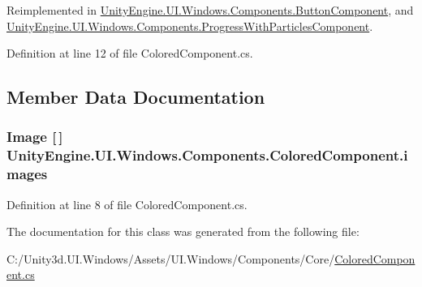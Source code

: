 Reimplemented in \hyperlink{class_unity_engine_1_1_u_i_1_1_windows_1_1_components_1_1_button_component_a314a01ca0eca508c95c4e69a729a51ff}{Unity\+Engine.\+U\+I.\+Windows.\+Components.\+Button\+Component}, and \hyperlink{class_unity_engine_1_1_u_i_1_1_windows_1_1_components_1_1_progress_with_particles_component_a67290737e0394995ebf2568cf647b35a}{Unity\+Engine.\+U\+I.\+Windows.\+Components.\+Progress\+With\+Particles\+Component}.



Definition at line 12 of file Colored\+Component.\+cs.



\subsection{Member Data Documentation}
\hypertarget{class_unity_engine_1_1_u_i_1_1_windows_1_1_components_1_1_colored_component_abad5dd27c4fc96fc10cf3a0632bc89fd}{}
\subsubsection[{images}]{\setlength{\rightskip}{0pt plus 5cm}Image \mbox{[}$\,$\mbox{]} Unity\+Engine.\+U\+I.\+Windows.\+Components.\+Colored\+Component.\+images}\label{class_unity_engine_1_1_u_i_1_1_windows_1_1_components_1_1_colored_component_abad5dd27c4fc96fc10cf3a0632bc89fd}


Definition at line 8 of file Colored\+Component.\+cs.



The documentation for this class was generated from the following file\+:\begin{DoxyCompactItemize}
\item 
C\+:/\+Unity3d.\+U\+I.\+Windows/\+Assets/\+U\+I.\+Windows/\+Components/\+Core/\hyperlink{_colored_component_8cs}{Colored\+Component.\+cs}\end{DoxyCompactItemize}
